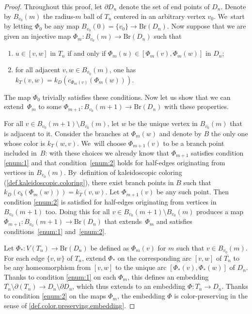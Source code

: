 \documentclass[JEP,XML,SOM,Unicode,NoFloatCountersInSection,published]{cedram}
\theoremstyle{plain}
\theoremstyle{definition}
\theoremstyle{remark}
\newcommand{\Br}{\mathrm{Br}}
\begin{document}
\begin{proof}
Throughout this proof, let $\partial D_n$ denote the set of end points of $D_n$.
Denote by $B_{v_0}(m)$ the radius-$m$ ball of $T_n$ centered in an arbitrary vertex $v_0$. We~start by letting $\Phi_0$ be any map $B_{v_0}(0) = \{v_0\} \to \Br(D_n)$.
Now suppose that we are given an injective map $\Phi_m \colon B_{v_0}(m) \to \Br(D_n)$ such that
\begin{enumerate}
\item\label{enum:1} $u \in [v,w]$ in $T_n$ if and only if $\Phi_m(u) \in [\Phi_m(v),\Phi_m(w)]$ in $D_n$;
\item\label{enum:2} for all adjacent $v,w \in B_{v_0}(m)$, one has $k_T (v,w) = k_D \left( c_{\Phi_m(v)} \left( \Phi_m \left(w\right) \right) \right)$.
\end{enumerate}
The map $\Phi_0$ trivially satisfies these conditions.
Now let us show that we can extend~$\Phi_m$ to some $\Phi_{m+1} \colon B_{v_0}(m+1) \to \Br(D_n)$ with these properties.

For all $v \in B_{v_0}(m+1) \setminus B_{v_0}(m)$, let $w$ be the unique vertex in $B_{v_0}(m)$ that is adjacent to it.
Consider the branches at $\Phi_m(w)$ and denote by $B$ the only one whose color is $k_T(w,v)$. We~will choose $\Phi_{m+1}(v)$ to be a branch point included in~$B$:
with these choices we already know that $\Phi_{m+1}$ satisfies condition \cref{enum:1} and that condition~\cref{enum:2} holds for half-edges originating from vertices in $B_{v_0}(m)$. By~definition of kaleidoscopic coloring (\cref{def.kaleidoscopic.coloring}), there exist branch points in $B$ such that $k_D\left(c_b(\Phi_m(w))\right) = k_T(v,w)$.
Let $\Phi_{m+1}(v)$ be any such point.
Then condition \cref{enum:2} is satisfied for half-edges originating from vertices in $B_{v_0}(m+1)$ too.
Doing this for all \hbox{$v \in B_{v_0}(m+1) \setminus B_{v_0}(m)$} produces a map $\Phi_{m+1} \colon B_{v_0}(m+1) \to \Br(D_n)$ that extends~$\Phi_m$ and satisfies conditions~\cref{enum:1} and~\cref{enum:2}.

Let $\Phi_* \colon V(T_n) \to \Br(D_n)$ be defined as $\Phi_m(v)$ for $m$ such that $v \in B_{v_0}(m)$.
For each edge $\{v,w\}$ of $T_n$, extend $\Phi_*$ on the corresponding arc $[v,w]$ of $\overline{T_n}$ to be any homeomorphism from $[v,w]$ to the unique arc $[\Phi_*(v),\Phi_*(w)]$ of $D_n$.
Thanks to condition \cref{enum:1} on each $\Phi_m$, this defines an embedding $\overline{T_n} \setminus \partial (T_n) \to D_n \setminus \partial D_n$, which thus extends to an embedding $\Phi \colon \overline{T_n} \to D_n$.
Thanks to condition \cref{enum:2} on the maps $\Phi_m$, the embedding $\Phi$ is color-preserving in the sense of \cref{def.color.preserving.embedding}.


\end{proof}
\end{document}
